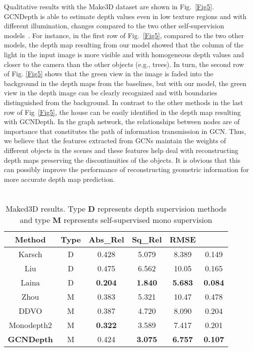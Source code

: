 \documentclass[journal]{IEEEtran}
\begin{document}
Qualitative results with the Make3D dataset are shown in Fig.~\ref{Fig5}. GCNDepth is able to estimate depth values even in low texture regions and with different illumination, changes compared to the two other self-supervision models~\cite{Shu2020,Godard2018}. For instance, in the first row of Fig.~\ref{Fig5}, compared to the two other models, the depth map resulting from our model showed that the column of the light in the input image is more visible and with homogeneous depth values and closer to the camera than the other objects (e.g., trees). In turn, the second row of Fig. \ref{Fig5} shows that the green view in the image is faded into the background in the depth maps from the baselines, but with our model, the green view in the depth image can be clearly recognized and with boundaries distinguished from the background. In contrast to the other methods in the last row of Fig~\ref{Fig5}, the house can be easily identified in the depth map resulting with GCNDepth. In the graph network, the relationships between nodes are of importance that constitutes the path of information transmission in GCN. Thus, we believe that the features extracted from GCNs maintain the weights of different objects in the scenes and these features help deal with reconstructing depth maps preserving the discontinuities of the objects. It is obvious that this can possibly improve the performance of reconstructing geometric information for more accurate depth map prediction.



\begin{table}[h!]
\centering
\captionsetup{justification=centering}
\caption{\\Maked3D results. Type \textbf{D} represents depth supervision methods and type \textbf{M} represents self-supervised mono supervision}
\begin{tabular}{|c|c|c|c|c|c|}
\hline
\textbf{Method}   & \textbf{Type} & \textbf{Abs\_Rel} & \textbf{Sq\_Rel} & \textbf{RMSE}  &    \\ \hline\hline
Karsch\cite{Karsch2019}            & D             & 0.428             & 5.079            & 8.389          & 0.149          \\
Liu\cite{Liu}               & D             & 0.475             & 6.562            & 10.05          & 0.165          \\
Laina\cite{Laina2016}             & D             & \textbf{0.204}    & \textbf{1.840}   & \textbf{5.683} & \textbf{0.084} \\ \hline
Zhou\cite{Zhou2017}              & M             & 0.383             & 5.321            & 10.47          & 0.478          \\
DDVO\cite{Wang}              & M             & 0.387             & 4.720            & 8.090          & 0.204          \\
Monodepth2\cite{Godard2018}        & M             & \textbf{0.322}    & 3.589            & 7.417          & 0.201          \\
\textbf{GCNDepth} & M             & 0.424             & \textbf{3.075}   & \textbf{6.757} & \textbf{0.107} \\ \hline
\end{tabular}
\label{table8}
\end{table}
\end{document}
